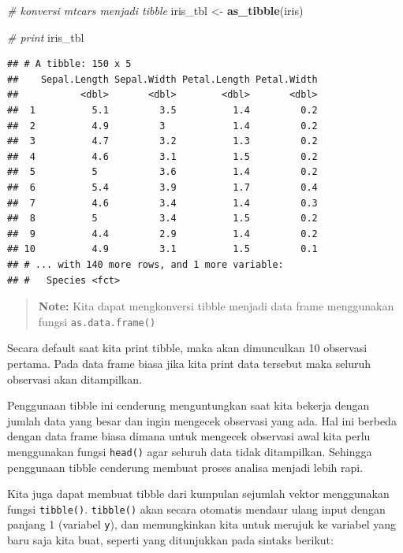 \documentclass[]{book}
\newenvironment{Shaded}{\begin{snugshade}}{\end{snugshade}}
\newcommand{\KeywordTok}[1]{\textcolor[rgb]{0.13,0.29,0.53}{\textbf{#1}}}
\newcommand{\StringTok}[1]{\textcolor[rgb]{0.31,0.60,0.02}{#1}}
\newcommand{\CommentTok}[1]{\textcolor[rgb]{0.56,0.35,0.01}{\textit{#1}}}
\newcommand{\NormalTok}[1]{#1}
\begin{document}
\begin{Shaded}
\begin{Highlighting}[]
\CommentTok{# konversi mtcars menjadi tibble}
\NormalTok{iris_tbl <-}\StringTok{ }\KeywordTok{as_tibble}\NormalTok{(iris)}

\CommentTok{# print}
\NormalTok{iris_tbl}
\end{Highlighting}
\end{Shaded}

\begin{verbatim}
## # A tibble: 150 x 5
##    Sepal.Length Sepal.Width Petal.Length Petal.Width
##           <dbl>       <dbl>        <dbl>       <dbl>
##  1          5.1         3.5          1.4         0.2
##  2          4.9         3            1.4         0.2
##  3          4.7         3.2          1.3         0.2
##  4          4.6         3.1          1.5         0.2
##  5          5           3.6          1.4         0.2
##  6          5.4         3.9          1.7         0.4
##  7          4.6         3.4          1.4         0.3
##  8          5           3.4          1.5         0.2
##  9          4.4         2.9          1.4         0.2
## 10          4.9         3.1          1.5         0.1
## # ... with 140 more rows, and 1 more variable:
## #   Species <fct>
\end{verbatim}

\begin{quote}
\textbf{Note: } Kita dapat mengkonversi tibble menjadi data frame
menggunakan fungsi \texttt{as.data.frame()}
\end{quote}

Secara default saat kita print tibble, maka akan dimunculkan 10
observasi pertama. Pada data frame biasa jika kita print data tersebut
maka seluruh observasi akan ditampilkan.

Penggunaan tibble ini cenderung menguntungkan saat kita bekerja dengan
jumlah data yang besar dan ingin mengecek observasi yang ada. Hal ini
berbeda dengan data frame biasa dimana untuk mengecek observasi awal
kita perlu menggunakan fungsi \texttt{head()} agar seluruh data tidak
ditampilkan. Sehingga penggunaan tibble cenderung membuat proses analisa
menjadi lebih rapi.

Kita juga dapat membuat tibble dari kumpulan sejumlah vektor menggunakan
fungsi \texttt{tibble()}. \texttt{tibble()} akan secara otomatis mendaur
ulang input dengan panjang 1 (variabel \texttt{y}), dan memungkinkan
kita untuk merujuk ke variabel yang baru saja kita buat, seperti yang
ditunjukkan pada sintaks berikut:
\end{document}
